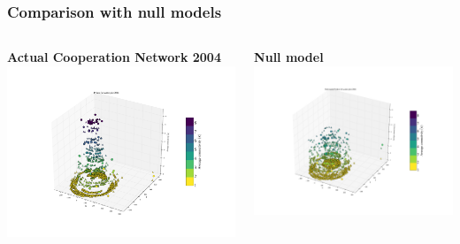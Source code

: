 \documentclass[ignorenonframetext,red,8pt,notes=hide]{beamer}
\begin{document}
\begin{frame}
\frametitle{Comparison with null models}

\begin{columns}[c]
\begin{column}{0.5\textwidth}
\begin{center}
\textbf{Actual Cooperation Network 2004}
\includegraphics[scale=0.16]{../../figures/3d_scatter_python_2004}
\end{center}
\end{column}

\begin{column}{0.5\textwidth}
\begin{center}
\textbf{Null model}
\includegraphics[scale=0.16]{../../figures/3d_scatter_python_2004_null}
\end{center}
\end{column}
\end{columns}

\end{frame}
\end{document}
